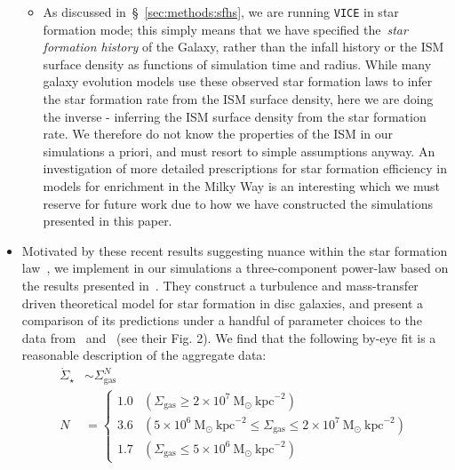 \documentclass[fleqn, usenatbib]{mnras}
\begin{document}
\begin{itemize}
\begin{itemize}
		\item As discussed in~\S~\ref{sec:methods:sfhs}, we are running 
		\texttt{VICE} in star formation mode; this simply means that we 
		have specified the~\textit{star formation history} of the Galaxy, 
		rather than the infall history or the ISM surface density as 
		functions of simulation time and radius. While many galaxy 
		evolution models use these observed star formation laws to infer 
		the star formation rate from the ISM surface density, here we are 
		doing the inverse - inferring the ISM surface density from the 
		star formation rate. We therefore do not know the properties of 
		the ISM in our simulations a priori, and must resort to simple 
		assumptions anyway. An investigation of more detailed 
		prescriptions for star formation efficiency in models for 
		enrichment in the Milky Way is an interesting which we must 
		reserve for future work due to how we have constructed the 
		simulations presented in this paper. 
	\end{itemize} 

	\item Motivated by these recent results suggesting nuance within the 
	star formation law~\citep{Leroy2013, Ellison2020b, Kennicutt2020}, we 
	implement in our simulations a three-component power-law based on the 
	results presented in~\citet{Krumholz2018}. They construct a turbulence and 
	mass-transfer driven theoretical model for star formation in disc galaxies, 
	and present a comparison of its predictions under a handful of parameter 
	choices to the data from~\citet{Bigiel2010} and~\citet{Leroy2013} (see 
	their Fig. 2). We find that the following by-eye fit is a reasonable 
	description of the aggregate data: 
	\begin{subequations}\begin{align} 
	\dot{\Sigma}_\star &\sim \Sigma_\text{gas}^N \\ 
	N &= \begin{cases} 
	1.0 & (\Sigma_\text{gas} \geq 2\times10^7~\text{M}_\odot~\text{kpc}^{-2}) 
	\\ 
	3.6 & (5\times10^6~\text{M}_\odot~\text{kpc}^{-2} \leq \Sigma_\text{gas} 
		\leq 2\times10^7~\text{M}_\odot~\text{kpc}^{-2}) 
	\\ 
	1.7 & (\Sigma_\text{gas} \leq 5\times10^6~\text{M}_\odot~\text{kpc}^{-2}) 
	\end{cases} 
	\label{eq:ks_law} 
	\end{align}\end{subequations} 


\end{itemize}
\end{document}
